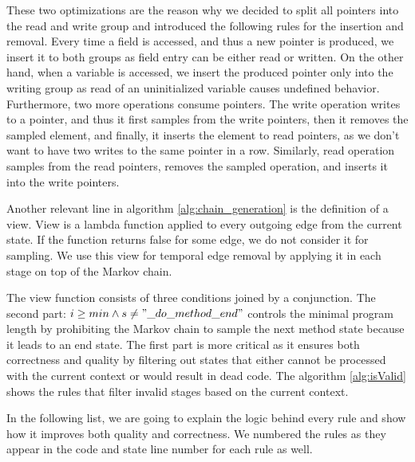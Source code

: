 \documentclass[sigplan,\review anonymous]{acmart}
\begin{document}
These two optimizations are the reason why we decided to split all pointers
into the read and write group and introduced the following rules for the
insertion and removal. Every time a field is accessed, and thus a new pointer
is produced, we insert it to both groups as field entry can be either read or
written. On the other hand, when a variable is accessed, we insert the produced
pointer only into the writing group as read of an uninitialized variable causes
undefined behavior. Furthermore, two more operations consume pointers. The
write operation writes to a pointer, and thus it first samples from the write
pointers, then it removes the sampled element, and finally, it inserts the
element to read pointers, as we don't want to have two writes to the same
pointer in a row. Similarly, read operation samples from the read pointers,
removes the sampled operation, and inserts it into the write pointers.

Another relevant line in algorithm \ref{alg:chain_generation} is the definition
of a view. View is a lambda function applied to every outgoing edge from the
current state. If the function returns false for some edge, we do not consider
it for sampling. We use this view for temporal edge removal by applying it in
each stage on top of the Markov chain.

The view function consists of three conditions joined by a conjunction. The
second part: $i \geq min \land s \neq "\_do\_method\_end"$ controls the minimal
program length by prohibiting the Markov chain to sample the next method state
because it leads to an end state. The first part is more critical as it ensures
both correctness and quality by filtering out states that either cannot be
processed with the current context or would result in dead code. The algorithm
\ref{alg:isValid} shows the rules that filter invalid stages based on the
current context.

In the following list, we are going to explain the logic behind every rule and
show how it improves both quality and correctness. We numbered the rules as
they appear in the code and state line number for each rule as well.
\end{document}
